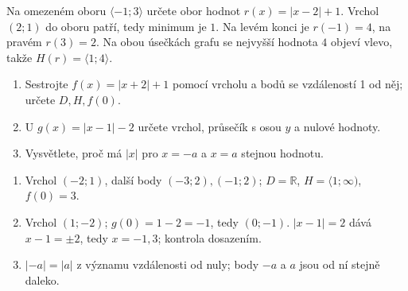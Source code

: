 \documentclass[11pt,a4paper]{article}
\begin{document}
\begin{zadaniReseniBox}[title={Rozšíření 1}]
Na omezeném oboru $\langle-1;3\rangle$ určete obor hodnot $r(x)=|x-2|+1$.
\tcblower
Vrchol $(2;1)$ do oboru patří, tedy minimum je $1$. Na levém konci je $r(-1)=4$, na pravém $r(3)=2$. Na obou úsečkách grafu se nejvyšší hodnota $4$ objeví vlevo, takže $H(r)=\langle1;4\rangle$.
\end{zadaniReseniBox}
\begin{zadaniReseniBox}[title={Domácí úkol}]
\begin{enumerate}[label=\alph*)]
\item Sestrojte $f(x)=|x+2|+1$ pomocí vrcholu a bodů se vzdáleností 1 od něj; určete $D,H,f(0)$.
\item U $g(x)=|x-1|-2$ určete vrchol, průsečík s osou $y$ a nulové hodnoty.
\item Vysvětlete, proč má $|x|$ pro $x=-a$ a $x=a$ stejnou hodnotu.
\end{enumerate}
\tcblower
\begin{enumerate}[label=\alph*)]
\item Vrchol $(-2;1)$, další body $(-3;2),(-1;2)$; $D=\mathbb R$, $H=\langle1;\infty)$, $f(0)=3$.
\item Vrchol $(1;-2)$; $g(0)=1-2=-1$, tedy $(0;-1)$. $|x-1|=2$ dává $x-1=\pm2$, tedy $x=-1,3$; kontrola dosazením.
\item $|-a|=|a|$ z významu vzdálenosti od nuly; body $-a$ a $a$ jsou od ní stejně daleko.
\end{enumerate}
\end{zadaniReseniBox}
\end{document}
